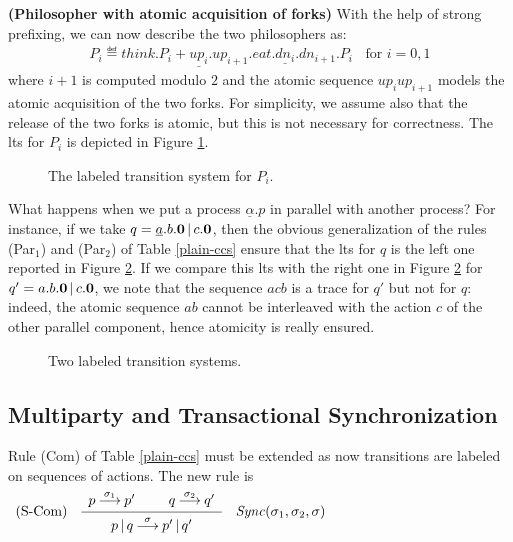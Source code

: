 \begin{example}\label{true-phil}{\bf (Philosopher with atomic acquisition of forks)}
With the help of strong prefixing, we can now describe the two philosophers as:
\begin{eqnarray*}
P_i \eqdef think.P_i + \underline{up_i}.up_{i+1}.eat.\underline{dn_i}.dn_{i+1}.P_i  \; \;  \mbox{   for  }i = 0, 1 
\end{eqnarray*}
where $i+1$ is computed modulo $2$ and  the atomic sequence $up_i up_{i+1}$ models the atomic 
acquisition of the two forks. For simplicity,
we assume also that the release of the two forks is atomic, but this is not necessary for correctness.
The lts for $P_i$ is depicted in Figure \ref{ltsphil}.
\fine
\end{example}

\begin{figure}[t]
\centering
%
\caption{The labeled transition system for $P_i$.}
\label{ltsphil}
\end{figure}

What happens when we put a process $\underline{\alpha}.p$ in parallel with another process? For instance, if we take 
$q = \underline{a}.b.\mbox{\bf 0} \mbox{$\,|\,$} c.\mbox{\bf 0}$, then the obvious generalization of the rules (Par$_1$) and (Par$_2$) 
of Table \ref{plain-ccs} ensure that the lts for 
$q$ is the left one reported in Figure \ref{abc-atomic}. If we compare this lts with the right one in Figure \ref{abc-atomic} 
for $q' = a.b.\mbox{\bf 0} \mbox{$\,|\,$} c.\mbox{\bf 0}$,
we note that the sequence $acb$ is a trace for $q'$ but not for $q$: indeed, the atomic sequence $ab$ cannot be interleaved
with the action $c$ of the other parallel component, hence atomicity is really ensured.

\begin{figure}[t]
\centering
%
\caption{Two labeled transition systems.}
\label{abc-atomic}
\end{figure}

    \subsection{Multiparty and Transactional Synchronization}

      Rule (Com) of Table \ref{plain-ccs} must be extended as now transitions are labeled on sequences of actions. The new rule is\\
      $\begin{array}{lcllcl}
	  \mbox{(S-Com)}  
	& 
	  \bigfrac{p\deriv{\sigma_1} p'\spazio q\deriv{\sigma_2}q'}{p\para q \deriv{\sigma}p'\para q'} 
	& 
	  \Sync(\sigma_1,  \sigma_2, \sigma) \\
      \end{array}$\\

